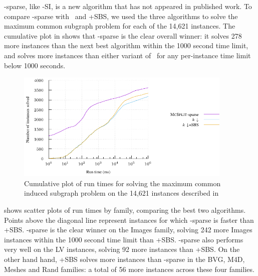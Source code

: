 \McSplit-sparse, like \McSplit-SI, is a new algorithm that
has not appeared in published work.
To compare \McSplit-sparse with \kDown\ and \kDown+SBS,
we used the three algorithms to solve the maximum
common subgraph problem for each of the 14,621 instances.
The cumulative plot in  
shows that \McSplit-sparse is the clear overall winner: it solves
278 more instances than the next best algorithm within the 1000 second
time limit, and solves more instances than either variant of \kDown\
for any per-instance time limit below 1000 seconds.

\begin{figure}[htb]
    \centering
    \includegraphics*[width=0.92\textwidth]{14b-mcsplit-induced-si/sip-instances-mcis-experiment/experiment/plots/cumulative.pdf}
    \caption{Cumulative plot of run times for solving the maximum common 
    induced subgraph problem on the 14,621 instances described in
    \Cref{subsec:si-decision-experiment}}
    \label{figure:mcsplit-sparse-cumulative}
\end{figure}

 shows scatter plots
of run times by family, comparing the best two algorithms.  Points
above the diagonal line represent instances for which \McSplit-sparse
is faster than \kDown+SBS. 
\McSplit-sparse is the clear winner on the Images family,
solving 242 more Images instances
within the 1000 second time limit than \kDown+SBS.
\McSplit-sparse also performs very well on the LV instances,
solving 92 more instances than \kDown+SBS.
On the other hand
hand, \kDown+SBS solves more instances than \McSplit-sparse in the
BVG, M4D, Meshes and Rand families: a total of 56 more instances across these
four families.


